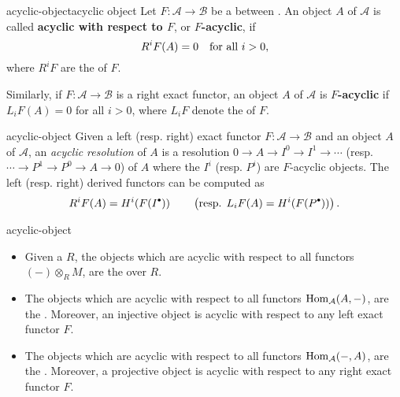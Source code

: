\begin{topic}{acyclic-object}{acyclic object}
    Let $F : \mathcal{A} \to \mathcal{B}$ be a  between . An object $A$ of $\mathcal{A}$ is called \textbf{acyclic with respect to $F$}, or \textbf{$F$-acyclic}, if
    \[ R^i F(A) = 0 \quad \textup{for all } i > 0, \]
    where $R^i F$ are the  of $F$.
    
    Similarly, if $F : \mathcal{A} \to \mathcal{B}$ is a right exact functor, an object $A$ of $\mathcal{A}$ is \textbf{$F$-acyclic} if $L_i F(A) = 0$ for all $i > 0$, where $L_i F$ denote the  of $F$.
\end{topic}

\begin{example}{acyclic-object}
    Given a left (resp. right) exact functor $F : \mathcal{A} \to \mathcal{B}$ and an object $A$ of $\mathcal{A}$, an \textit{acyclic resolution} of $A$ is a resolution $0 \to A \to I^0 \to I^1 \to \cdots$ (resp. $\cdots \to P^1 \to P^0 \to A \to 0$) of $A$ where the $I^i$ (resp. $P^i$) are $F$-acyclic objects. The left (resp. right) derived functors can be computed as
    \[ R^i F(A) = H^i(F(I^\bdot)) \qquad \left(\textup{resp. } L_i F(A) = H^i(F(P^\bdot)) \right) . \]
\end{example}

\begin{example}{acyclic-object}
    \begin{itemize}
        \item Given a  $R$, the objects which are acyclic with respect to all functors $(-) \otimes_R M$, are the  over $R$.
        \item The objects which are acyclic with respect to all functors $\operatorname{Hom}_\mathcal{A}(A, -)$, are the . Moreover, an injective object is acyclic with respect to any left exact functor $F$.
        \item The objects which are acyclic with respect to all functors $\operatorname{Hom}_\mathcal{A}(-, A)$, are the . Moreover, a projective object is acyclic with respect to any right exact functor $F$.
    \end{itemize}
\end{example}

